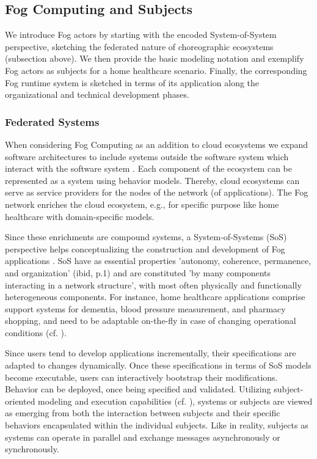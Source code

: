 \subsection{Fog Computing and Subjects}

We introduce Fog actors by starting with the encoded System-of-System perspective, sketching the federated nature of choreographic ecosystems (subsection above). We then provide the basic modeling notation and exemplify Fog actors as subjects for a home healthcare scenario. Finally, the corresponding Fog runtime system is sketched in terms of its application along the organizational and technical development phases. 

\subsubsection{Federated Systems}
When considering Fog Computing as an addition to cloud ecosystems we expand software architectures to include systems outside the software system which interact with the software system \cite{article:FogPattern}. Each component of the ecosystem can be represented as a system using behavior models. Thereby, cloud ecosystems can serve as service providers for the nodes of the network (of applications). The Fog network enriches the cloud ecosystem, e.g., for specific purpose like home healthcare with domain-specific models.\

Since these enrichments are compound systems, a System-of-Systems (SoS) perspective helps conceptualizing the construction and development of Fog applications \cite{article:SyS}. SoS have as essential properties 'autonomy, coherence, permanence, and organization' (ibid, p.1) and are constituted 'by many components interacting in a network structure', with most often physically and functionally heterogeneous components. For instance, home healthcare applications comprise support systems for dementia, blood pressure measurement, and pharmacy shopping, and need to be adaptable on-the-fly in case of changing operational conditions (cf. \cite{article:DesignHealth}).\

Since users tend to develop applications incrementally, their specifications are adapted to changes dynamically. Once these specifications in terms of SoS models become executable, users can interactively bootstrap their modifications. Behavior can be deployed, once being specified and validated. Utilizing subject-oriented modeling and execution capabilities (cf. \cite{Flei12}), systems or subjects are viewed as emerging from both the interaction between subjects and their specific behaviors encapsulated within the individual subjects. Like in reality, subjects as systems can operate in parallel and exchange messages asynchronously or synchronously.

